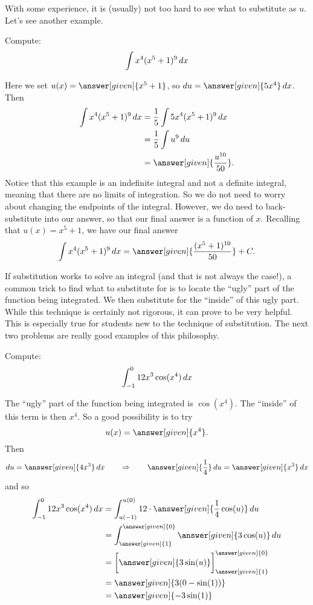\documentclass{ximera}
\begin{document}
With some experience, it is (usually) not too hard to see what to
substitute as $u$. Let's see another
example.

\begin{example}
Compute:
\[
\int x^4(x^5+1)^{9} \mathop{}\!d x
\]
\begin{explanation}
Here we set $u(x) =  \answer[given]{x^5+1}$, so $\d u =  \answer[given]{5x^4} \d x$.  Then
\begin{align*}
  \int x^4(x^5+1)^{9} \d x &= \frac{1}{5} \int 5x^4 (x^5+1)^{9} \d x \\
  &= \frac{1}{5} \int u^{9} \d u\\
&= \answer[given]{\frac{u^{10}}{50}}.
\end{align*}
Notice that this example is an indefinite integral and not a definite
integral, meaning that there are no limits of integration.  So we do
not need to worry about changing the endpoints of the integral.  However,
we do need to back-substitute into our answer, so that our final
answer is a function of $x$.  Recalling that $u(x) = x^5+1$, we have
our final answer
\[
\int x^4(x^5+1)^{9} \d x= \answer[given]{\frac{(x^5+1)^{10}}{50}}+C.
\]
\end{explanation}
\end{example}


If substitution works to solve an integral (and that is not always the
case!), a common trick to find what to substitute for is to locate the
``ugly'' part of the function being integrated.  We then substitute
for the ``inside'' of this ugly part.  While this technique is
certainly not rigorous, it can prove to be very helpful.  This is
especially true for students new to the technique of substitution.
The next two problems are really good examples of this philosophy.

\begin{example}
Compute:
\[
\int_{-1}^0 12x^3 \cos(x^4) \mathop{}\!d x
\]
\begin{explanation}
The ``ugly'' part of the function being integrated is $\cos(x^4)$.  The
``inside'' of this term is then $x^4$.  So a good possibility is to
try
\[
u(x) =  \answer[given]{x^4}.
\]
Then
\[
\d u =  \answer[given]{4x^3} \d x 	\qquad	\Rightarrow	\qquad	\answer[given]{\frac{1}{4}} \d u = \answer[given]{x^3}\d x
\]
and so
\begin{align*}
\int_{-1}^0 12x^3 \cos(x^4) \d x &= \int_{u(-1)}^{u(0)} 12 \cdot\answer[given]{\frac{1}{4}\cos(u)} \d u  \\
&= \int_{\answer[given]{1}}^{\answer[given]{0}} \answer[given]{3 \cos(u)} \d u  \\
&= \eval{\answer[given]{3\sin(u)}}_{\answer[given]{1}}^{\answer[given]{0}}  \\
&= \answer[given]{3(0-\sin(1))}\\
&= \answer[given]{-3\sin(1)}
\end{align*}
\end{explanation}
\end{example}
\end{document}
